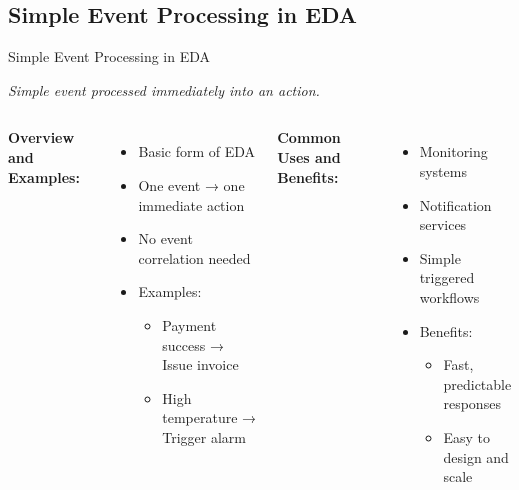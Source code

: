 \documentclass[aspectratio=169, table]{beamer}
\begin{document}
	\subsection{Simple Event Processing in EDA}
	\begin{frame}[fragile]{Simple Event Processing in EDA}
		\vspace{20pt}
		\centering
		
		\vspace{10pt}
		\scriptsize \textit{Simple event processed immediately into an action.}
		
		\vspace{15pt}
		\begin{columns}[T]
			\textbf{Overview and Examples:}
			\begin{itemize}
				\item Basic form of EDA
				\item One event → one immediate action
				\item No event correlation needed
				\item Examples:
				\begin{itemize}
					\item Payment success → Issue invoice
					\item High temperature → Trigger alarm
				\end{itemize}
			\end{itemize}
			
			\textbf{Common Uses and Benefits:}
			\begin{itemize}
				\item Monitoring systems
				\item Notification services
				\item Simple triggered workflows
				\item Benefits:
				\begin{itemize}
					\item Fast, predictable responses
					\item Easy to design and scale
				\end{itemize}
			\end{itemize}
		\end{columns}
	\end{frame}
	
\end{document}
